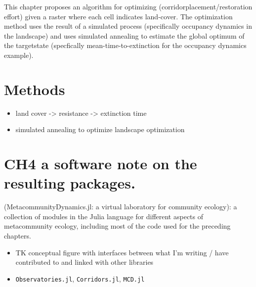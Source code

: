 \documentclass[11pt]{article}
\begin{document}
This chapter proposes an algorithm for optimizing
(corridorplacement/restoration effort) given a raster where each cell
indicates land-cover. The optimization method uses the result of a
simulated process (specifically occupancy dynamics in the landscape) and
uses simulated annealing to estimate the global optimum of the
targetstate (specfically mean-time-to-extinction for the occupancy
dynamics example).

\hypertarget{methods-2}{%
\section{Methods}\label{methods-2}}

\begin{itemize}
\tightlist
\item
  land cover -\textgreater{} resistance -\textgreater{} extinction time
\item
  simulated annealing to optimize landscape optimization
\end{itemize}

\hypertarget{ch4-a-software-note-on-the-resulting-packages.}{%
\section{CH4 a software note on the resulting
packages.}\label{ch4-a-software-note-on-the-resulting-packages.}}

(MetacommunityDynamics.jl: a virtual laboratory for community ecology):
a collection of modules in the Julia language for different aspects of
metacommunity ecology, including most of the code used for the preceding
chapters.

\begin{itemize}
\item
  TK conceptual figure with interfaces between what I'm writing / have
  contributed to and linked with other libraries
\item
  \texttt{Observatories.jl}, \texttt{Corridors.jl}, \texttt{MCD.jl}
\end{itemize}
\end{document}
